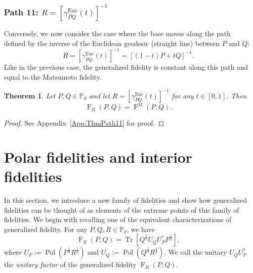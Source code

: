 \documentclass[12pt]{article}
\newtheorem{theorem}{Theorem}[section] %
\theoremstyle{definition}
\begin{document}
\subsubsection{Path 11: $R = [\gamma^\text{Euc}_{PQ}(t)]^{-1}$}
Conversely, we now consider the case where the base moves along the path defined by the inverse of the Euclidean geodesic (straight line) between $P$ and $Q$:
\begin{equation}
R = \left[\gamma^\text{Euc}_{P Q}(t)\right] ^{-1}  = \left[(1-t)P + tQ \right]^{-1}.
\end{equation}
Like in the previous case, the generalized fidelity is constant along this path and equal to the Matsumoto fidelity. 
\begin{theorembox}
    \begin{theorem}\label{Thm:Path11}
       Let $P, Q \in \mathbb P_d$ and let $R = [\gamma_{PQ}^\mathrm{Euc}(t)]^{-1} $ for any $t \in [0,1]$. Then 
        \begin{equation}
             \operatorname{F}_R(P,Q) = \operatorname{F}^\mathrm M(P,Q). 
        \end{equation}    
    \end{theorem}
\end{theorembox}
\begin{proof}
    See Appendix~\ref{App:ThmPath11} for proof.
\end{proof}


\section{Polar fidelities and interior fidelities } \label{Sec:PolarFidelity}

In this section, we introduce a new family of fidelities and show how generalized fidelities can be thought of as elements of the extreme points of this family of fidelities. We begin with recalling one of the equivalent characterizations of generalized fidelity. For any $P,Q,R \in \mathbb P_d$, we have
\begin{equation}
    \operatorname{F}_R(P,Q) = \operatorname{Tr}\left[Q ^{\frac12} U_Q U_P^* P ^{\frac12} \right],
\end{equation}
where $U_P := \operatorname{Pol}\left(P ^{\frac12} R ^{\frac12} \right)$ and $U_Q := \operatorname{Pol}\left(Q ^{\frac12} R ^{\frac12} \right)$. We call the unitary $U_Q U_P^*$ the \textit{unitary factor} of the generalized fidelity $\operatorname{F}_R(P,Q)$. 
\end{document}
